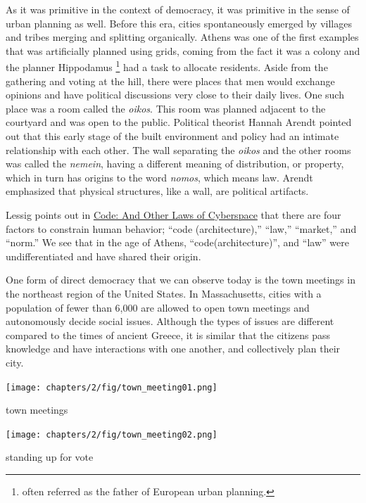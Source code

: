 As it was primitive in the context of democracy, it was primitive in the sense
of urban planning as well. Before this era, cities spontaneously emerged by villages
and tribes merging and splitting organically. Athens was one of the first examples
that was artificially planned using grids,
coming from the fact it was a colony and the planner Hippodamus \footnote{often referred as the father of European urban planning.} had a task to allocate residents. Aside from the gathering and voting at the hill, there were places that men would exchange opinions and have political discussions very close to their daily lives. One such place was a room called the \textit{oikos}. This room was planned adjacent to the courtyard and was open to the public. Political theorist Hannah Arendt\cite{arendt2013human} pointed out that this early stage of the built environment and policy had an intimate relationship with each other. The wall separating the \textit{oikos} and the other rooms was called the \textit{nemein}, having a different meaning of distribution, or property, which in turn has origins to the word \textit{nomos}, which means law. Arendt emphasized that physical structures, like a wall, are political artifacts.

Lessig points out in \underline{Code: And Other Laws of Cyberspace} that there are four factors to constrain human behavior; ``code (architecture),'' ``law,'' ``market,'' and ``norm.'' \cite{lessig2009code} We see that in the age of Athens, ``code(architecture)'', and ``law'' were undifferentiated and have shared their origin.

One form of direct democracy that we can observe today is the town meetings in the northeast region of the United States. In Massachusetts, cities with a population of fewer than 6,000 are allowed to open town meetings and autonomously decide social issues. Although the types of issues are different compared to the times of ancient Greece, it is similar that the citizens pass knowledge and have interactions with one another, and collectively plan their city.


\begin{marginfigure}[{-20cm}]
  \texttt{[image: chapters/2/fig/town\_meeting01.png]}               
  \caption[town meetings: moderator]{town meetings}
  \label{fig:town_meeting}
\end{marginfigure}

\begin{marginfigure}[{-10cm}]
  \texttt{[image: chapters/2/fig/town\_meeting02.png]}               
  \caption[town meetings: voting]{standing up for vote}
  \label{fig:spin_margin}
\end{marginfigure}


